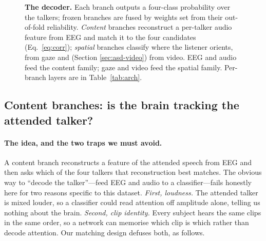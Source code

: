 \documentclass[10pt,twocolumn]{article}
\begin{document}
\begin{figure}[t]
\caption{\textbf{The decoder.} Each branch outputs a four-class probability over
the talkers; frozen branches are fused by weights set from their out-of-fold
reliability. \emph{Content} branches reconstruct a per-talker audio feature from
EEG and match it to the four candidates (Eq.~\ref{eq:corr}); \emph{spatial}
branches classify where the listener orients, from gaze and (Section
\ref{sec:asd-video}) from video. EEG and audio feed the content family; gaze and
video feed the spatial family. Per-branch layers are in Table~\ref{tab:arch}.}
\label{fig:arch}
\end{figure}

\subsection{Content branches: is the brain tracking the attended talker?}
\label{sec:asd-content}

\paragraph{The idea, and the two traps we must avoid.}
A content branch reconstructs a feature of the attended speech from EEG and then
asks which of the four talkers that reconstruction best matches. The obvious way
to ``decode the talker''---feed EEG and audio to a classifier---fails honestly
here for two reasons specific to this dataset. \emph{First, loudness.} The
attended talker is mixed louder, so a classifier could read attention off
amplitude alone, telling us nothing about the brain. \emph{Second, clip
identity.} Every subject hears the same clips in the same order, so a network can
memorise which clip is which rather than decode attention. Our matching design
defuses both, as follows.
\end{document}
